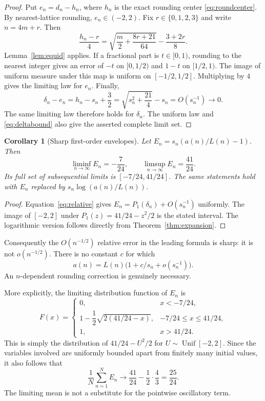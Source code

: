 \documentclass[11pt,letterpaper]{article}
\newtheorem{corollary}[theorem]{Corollary}
\theoremstyle{remark}
\newcommand{\Unif}{\operatorname{Unif}}
\begin{document}
\begin{proof}
Put $e_n=d_n-h_n$, where $h_n$ is the exact rounding center
\eqref{eq:roundcenter}. By nearest-lattice rounding, $e_n\in(-2,2)$.
Fix $r\in\{0,1,2,3\}$ and write $n=4m+r$. Then
\begin{equation}\label{eq:roundphase}
 \frac{h_n-r}{4}
 =\sqrt{\frac m2+\frac{8r+21}{64}}-\frac{3+2r}{8}.
\end{equation}
Lemma~\ref{lem:equid} applies. If a fractional part is $t\in[0,1)$, rounding
to the nearest integer gives an error of $-t$ on $[0,1/2)$ and $1-t$ on
$[1/2,1)$. The image of uniform measure under this map is uniform on
$[-1/2,1/2]$. Multiplying by $4$ gives the limiting law for $e_n$.
Finally,
\[
 \delta_n-e_n=h_n-s_n+\frac32
 =\sqrt{s_n^2+\frac{21}{4}}-s_n=O(s_n^{-1})\longrightarrow0.
\]
The same limiting law therefore holds for $\delta_n$. The uniform law and
\eqref{eq:deltabound} also give the asserted complete limit set.
\end{proof}

\begin{corollary}[Sharp first-order envelopes]\label{cor:envelopes}
Let $E_n=s_n(a(n)/L(n)-1)$. Then
\begin{equation}\label{eq:sharpE}
 \boxed{\displaystyle
 \liminf_{n\to\infty}E_n=-\frac7{24},\qquad
 \limsup_{n\to\infty}E_n=\frac{41}{24}.}
\end{equation}
Its full set of subsequential limits is $[-7/24,41/24]$. The same statements
hold with $E_n$ replaced by $s_n\log(a(n)/L(n))$.
\end{corollary}

\begin{proof}
Equation~\eqref{eq:relative} gives
$E_n=P_1(\delta_n)+O(s_n^{-1})$ uniformly. The image of $[-2,2]$ under
$P_1(z)=41/24-z^2/2$ is the stated interval. The logarithmic version follows
directly from Theorem~\ref{thm:expansion}.
\end{proof}

Consequently the $O(n^{-1/2})$ relative error in the leading formula is sharp:
it is not $o(n^{-1/2})$. There is no constant $c$ for which
\[
 a(n)=L(n)\bigl(1+c/s_n+o(s_n^{-1})\bigr).
\]
An $n$-dependent rounding correction is genuinely necessary.

More explicitly, the limiting distribution function of $E_n$ is
\begin{equation}\label{eq:Ecdf}
 F(x)=
 \begin{cases}
 0,&x<-7/24,\\[2pt]
 1-\dfrac12\sqrt{2(41/24-x)},&-7/24\le x\le41/24,\\[4pt]
 1,&x>41/24.
 \end{cases}
\end{equation}
This is simply the distribution of $41/24-U^2/2$ for
$U\sim\Unif[-2,2]$. Since the variables involved are uniformly bounded
apart from finitely many initial values, it also follows that
\[
 \frac1N\sum_{n=1}^N E_n\longrightarrow
 \frac{41}{24}-\frac12\cdot\frac43=\frac{25}{24}.
\]
The limiting mean is not a substitute for the pointwise oscillatory term.
\end{document}
